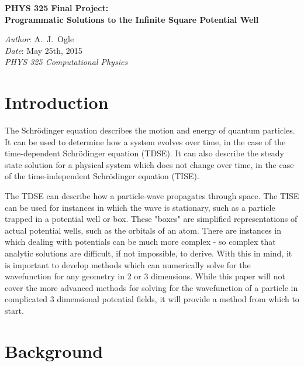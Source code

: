 \documentclass[12pt]{article}                  %
\begin{document}

\begin{center}
{\large \bf{PHYS 325 Final Project:\\
Programmatic Solutions to the Infinite Square Potential Well}}\\
\end{center}
\begin{flushleft}                              %
{\em Author}: A.~J.~Ogle \\                    %
{\em Date}: May 25th, 2015\\
{\em PHYS 325 Computational Physics}\\
\end{flushleft}

\section{Introduction}
	The Schrödinger equation describes the motion and energy of quantum particles. It can be used to determine how a system evolves over time, in the case of the time-dependent Schrödinger equation (TDSE). It can also describe the steady state solution for a physical system which does not change over time, in the case of the time-independent Schrödinger equation (TISE). 
	
The TDSE can describe how a particle-wave propagates through space. The TISE can be used for instances in which the wave is stationary, such as a particle trapped in a potential well or box. These "boxes" are simplified representations of actual potential wells, such as the orbitals of an atom. There are instances in which dealing with potentials can be much more complex - so complex that analytic solutions are difficult, if not impossible, to derive. With this in mind, it is important to develop methods which can numerically solve for the wavefunction for any geometry in 2 or 3 dimensions. While this paper will not cover the more advanced methods for solving for the wavefunction of a particle in complicated 3 dimensional potential fields, it will provide a method from which to start. 

\section{Background}
\end{document}
